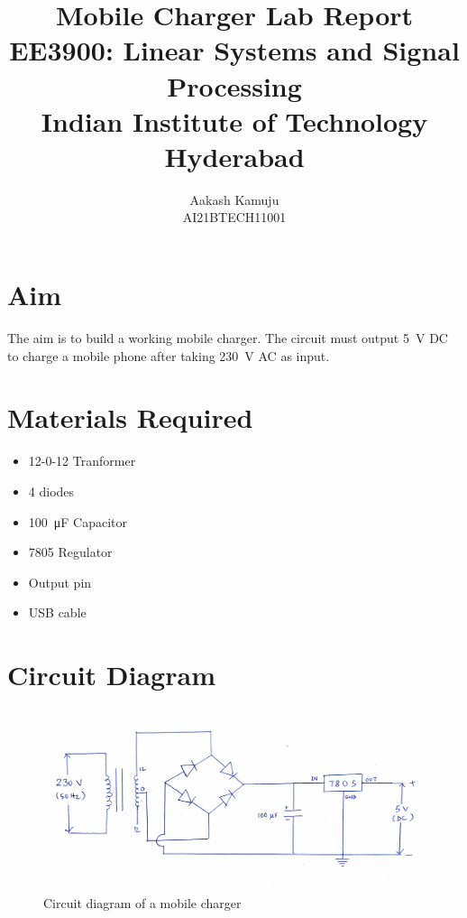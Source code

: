 \documentclass[journal,12pt,twocolumn]{IEEEtran}
\title{Mobile Charger Lab Report \\ \Large EE3900: Linear Systems and Signal Processing \\ \large Indian Institute of Technology Hyderabad}
\author{Aakash Kamuju \\ \normalsize AI21BTECH11001 \\ \vspace*{20pt} }
\numberwithin{equation}{section}
\numberwithin{figure}{section}
\begin{document}
	\maketitle

	\section{Aim}
	The aim is to build a working mobile charger. The circuit must output \SI{5}{\volt} DC to charge a mobile phone after taking \SI{230}{\volt} AC as input.
	
	\section{Materials Required}
	\begin{itemize}
	\item 12-0-12 Tranformer
	\item 4 diodes
	\item \SI{100}{\micro\farad} Capacitor
	\item 7805 Regulator
	\item Output pin
	\item USB cable
	\end{itemize}

	\section{Circuit Diagram}
	\begin{figure}[!ht]
		\centering
		\includegraphics[width=\columnwidth]{./figs/circuit.pdf}
		\caption{Circuit diagram of a mobile charger}
		\label{fig-ckt}	
	\end{figure}
	
\end{document}
